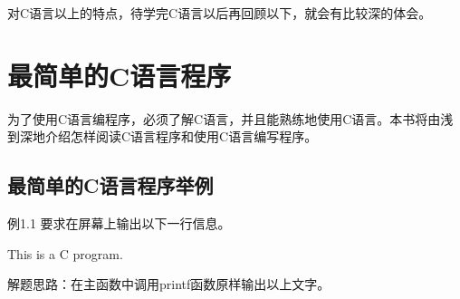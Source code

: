 对C语言以上的特点，待学完C语言以后再回顾以下，就会有比较深的体会。

\section{最简单的C语言程序}

为了使用C语言编程序，必须了解C语言，并且能熟练地使用C语言。本书将由浅到深地介绍怎样阅读C语言程序和使用C语言编写程序。

\subsection{最简单的C语言程序举例}

例1.1 要求在屏幕上输出以下一行信息。
\begin{lslisting}
This is a C program.
\end{lslisting}

解题思路：在主函数中调用printf函数原样输出以上文字。

